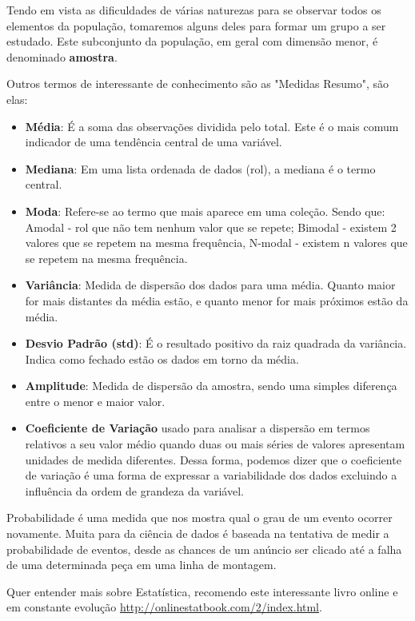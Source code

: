 Tendo em vista as dificuldades de várias naturezas para se observar todos os elementos da população, tomaremos alguns deles para formar um grupo a ser estudado. Este subconjunto da população, em geral com dimensão menor, é denominado \textbf{amostra}.

Outros termos de interessante de conhecimento são as "Medidas Resumo", são elas:
\begin{itemize}
	\item \textbf{Média}: É a soma das observações dividida pelo total. Este é o mais comum indicador de uma tendência central de uma variável.
	\item \textbf{Mediana}: Em uma lista ordenada de dados (rol), a mediana é o termo central.
	\item \textbf{Moda}: Refere-se ao termo que mais aparece em uma coleção. Sendo que: Amodal - rol que não tem nenhum valor que se repete; Bimodal - existem 2 valores que se repetem na mesma frequência, N-modal - existem n valores que se repetem na mesma frequência.
	\item \textbf{Variância}: Medida de dispersão dos dados para uma média. Quanto maior for mais distantes da média estão, e quanto menor for mais próximos estão da média.
	\item \textbf{Desvio Padrão (std)}: É o resultado positivo da raiz quadrada da variância. Indica como fechado estão os dados em torno da média.
	\item \textbf{Amplitude}: Medida de dispersão da amostra, sendo uma simples diferença entre o menor e maior valor.
	\item \textbf{Coeficiente de Variação} usado para analisar a dispersão em termos relativos a seu valor médio quando duas ou mais séries de valores apresentam unidades de medida diferentes. Dessa forma, podemos dizer que o coeficiente de variação é uma forma de expressar a variabilidade dos dados excluindo a influência da ordem de grandeza da variável.
\end{itemize}

Probabilidade é uma medida que nos mostra qual o grau de um evento ocorrer novamente. Muita para da ciência de dados é baseada na tentativa de medir a probabilidade de eventos, desde as chances de um anúncio ser clicado até a falha de uma determinada peça em uma linha de montagem.

\begin{note} Quer entender mais sobre Estatística, recomendo este interessante livro online e em constante evolução \url{http://onlinestatbook.com/2/index.html}.
\end{note}
	
